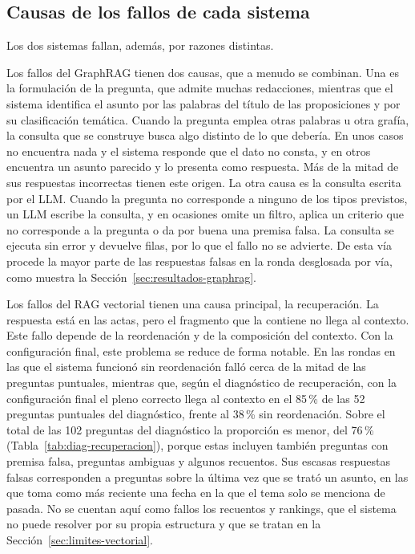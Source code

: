 \documentclass[11pt, a4paper]{report}
\begin{document}
	\subsection{Causas de los fallos de cada sistema}
	\label{sec:causas-fallos}

	Los dos sistemas fallan, además, por razones distintas.

	Los fallos del GraphRAG tienen dos causas, que a menudo se combinan. Una es
	la formulación de la pregunta, que admite muchas redacciones,
	mientras que el sistema identifica el asunto por las palabras del título de
	las proposiciones y por su clasificación temática. Cuando la pregunta emplea
	otras palabras u otra grafía, la consulta que se construye busca algo distinto
	de lo que debería. En unos casos no encuentra nada y el sistema responde que
	el dato no consta, y en otros encuentra un asunto parecido y lo presenta como
	respuesta. Más de la mitad de sus respuestas incorrectas tienen este origen.
	La otra causa es la consulta escrita por el LLM. Cuando la pregunta no
	corresponde a ninguno de los tipos previstos, un LLM escribe la consulta, y en
	ocasiones omite un filtro, aplica un criterio que no corresponde a la pregunta
	o da por buena una premisa falsa. La consulta se ejecuta sin error y devuelve
	filas, por lo que el fallo no se advierte. De esta vía procede la mayor parte
	de las respuestas falsas en la ronda desglosada por vía, como muestra la
	Sección~\ref{sec:resultados-graphrag}.

	Los fallos del RAG vectorial tienen una causa principal, la recuperación. La respuesta está en las actas, pero el fragmento que la contiene
	no llega al contexto. Este fallo depende de la reordenación y de la composición del
	contexto. Con la configuración final, este problema se reduce de forma notable. En las
	rondas en las que el sistema funcionó sin reordenación falló cerca de la mitad
	de las preguntas puntuales, mientras que, según el diagnóstico de recuperación,
	con la configuración final el pleno correcto llega al contexto en el 85\,\% de
	las 52 preguntas puntuales del diagnóstico, frente al 38\,\% sin reordenación.
	Sobre el total de las 102 preguntas del diagnóstico la proporción es menor, del
	76\,\% (Tabla~\ref{tab:diag-recuperacion}), porque estas incluyen también
	preguntas con premisa falsa, preguntas ambiguas y algunos recuentos. Sus escasas respuestas falsas corresponden a preguntas sobre la
	última vez que se trató un asunto, en las que toma como más reciente una fecha
	en la que el tema solo se menciona de pasada. No se cuentan aquí como fallos
	los recuentos y rankings, que el sistema no puede resolver por su propia
	estructura y que se tratan en la Sección~\ref{sec:limites-vectorial}.
\end{document}
